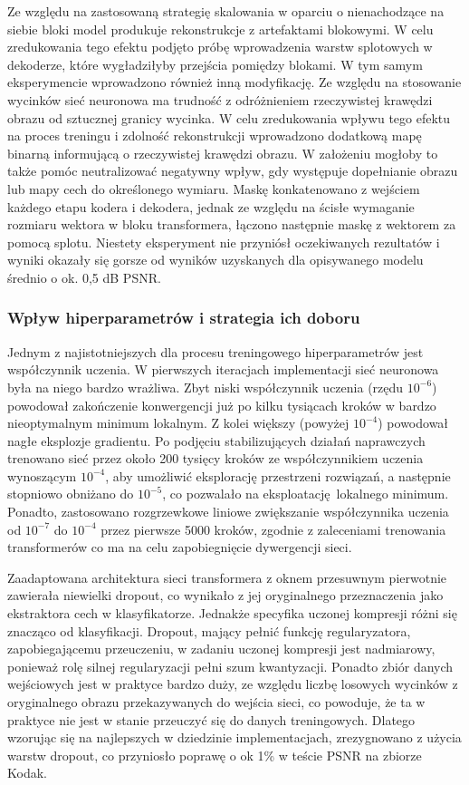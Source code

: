 Ze względu na zastosowaną strategię skalowania w oparciu o nienachodzące na siebie bloki model produkuje rekonstrukcje z artefaktami blokowymi. W celu zredukowania tego efektu podjęto próbę wprowadzenia warstw splotowych w dekoderze, które wygładziłyby przejścia pomiędzy blokami. W tym samym eksperymencie wprowadzono również inną modyfikację. Ze względu na stosowanie wycinków sieć neuronowa ma trudność z odróżnieniem rzeczywistej krawędzi obrazu od sztucznej granicy wycinka. W celu zredukowania wpływu tego efektu na proces treningu i zdolność rekonstrukcji wprowadzono dodatkową mapę binarną informującą o rzeczywistej krawędzi obrazu. W założeniu mogłoby to także pomóc neutralizować negatywny wpływ, gdy występuje dopełnianie obrazu lub mapy cech do określonego wymiaru. Maskę konkatenowano z wejściem każdego etapu kodera i dekodera, jednak ze względu na ścisłe wymaganie rozmiaru wektora w bloku transformera, łączono następnie maskę z wektorem za pomocą splotu. Niestety eksperyment nie przyniósł oczekiwanych rezultatów i wyniki okazały się gorsze od wyników uzyskanych dla opisywanego modelu średnio o ok. 0,5 dB PSNR.
\subsubsection{Wpływ hiperparametrów i strategia ich doboru}
Jednym z najistotniejszych dla procesu treningowego hiperparametrów jest współczynnik uczenia. W pierwszych iteracjach implementacji sieć neuronowa była na niego bardzo wrażliwa. Zbyt niski współczynnik uczenia (rzędu \( 10^{-6} \)) powodował zakończenie konwergencji już po kilku tysiącach kroków w bardzo nieoptymalnym minimum lokalnym. Z kolei większy (powyżej \( 10^{-4} \)) powodował nagłe eksplozje gradientu. Po podjęciu stabilizujących działań naprawczych trenowano sieć przez około 200 tysięcy kroków ze współczynnikiem uczenia wynoszącym \( 10^{-4} \), aby umożliwić eksplorację przestrzeni rozwiązań, a następnie stopniowo obniżano do \( 10^{-5} \), co pozwalało na eksploatację lokalnego minimum. Ponadto, zastosowano rozgrzewkowe liniowe zwiększanie współczynnika uczenia od \( 10^{-7} \) do \( 10^{-4} \) przez pierwsze 5000 kroków, zgodnie z zaleceniami trenowania transformerów\cite{Popel_2018} co ma na celu zapobiegnięcie dywergencji sieci.

Zaadaptowana architektura sieci transformera z oknem przesuwnym pierwotnie zawierała niewielki dropout, co wynikało z jej oryginalnego przeznaczenia jako ekstraktora cech w klasyfikatorze. Jednakże specyfika uczonej kompresji różni się znacząco od klasyfikacji. Dropout, mający pełnić funkcję regularyzatora, zapobiegającemu przeuczeniu, w zadaniu uczonej kompresji jest nadmiarowy, ponieważ rolę silnej regularyzacji pełni szum kwantyzacji. Ponadto zbiór danych wejściowych jest w praktyce bardzo duży, ze względu liczbę losowych wycinków z oryginalnego obrazu przekazywanych do wejścia sieci, co powoduje, że ta w praktyce nie jest w stanie przeuczyć się do danych treningowych. Dlatego wzorując się na najlepszych w dziedzinie implementacjach, zrezygnowano z użycia warstw dropout, co przyniosło poprawę o ok 1\% w teście PSNR na zbiorze Kodak.


